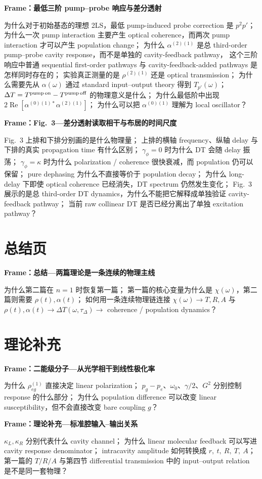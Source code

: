 \documentclass[11pt]{ctexart}
\newcommand{\framecue}[1]{%
  \par\smallskip
  \noindent\textbf{#1}\quad
}
\begin{document}
\framecue{Frame：最低三阶 pump--probe 响应与差分透射}
为什么对于初始基态的理想 2LS，最低 pump-induced probe correction 是 \(p^2p'\)；
为什么一次 pump interaction 主要产生 optical coherence，而两次 pump interaction 才可以产生 population change；
为什么 \(\alpha^{(2)(1)}\) 是总 third-order pump--probe cavity response，而不是单独的 cavity-feedback pathway，
这个三阶响应中普通 sequential first-order pathways 与 cavity-feedback-added pathways 是怎样同时存在的；
实验真正测量的是 \(\rho^{(2)(1)}\) 还是 optical transmission；
为什么需要先从 \(\alpha(\omega)\) 通过 standard input--output theory 得到 \(T_{p'}(\omega)\)；
\(\Delta T=T^{\rm pump\,on}-T^{\rm pump\,off}\) 的物理意义是什么；
为什么最低阶中出现 \(2\operatorname{Re}\left[\alpha^{(0)(1)*}\alpha^{(2)(1)}\right]\)；
为什么可以把 \(\alpha^{(0)(1)}\) 理解为 local oscillator？

\framecue{Frame：Fig.~3---差分透射读取相干与布居的时间尺度}
Fig.~3 上排和下排分别画的是什么物理量；
上排的横轴 frequency、纵轴 delay 与下排的真实 propagation time 有什么区别；
\(\gamma_\phi=0\) 时为什么 DT 会随 delay 振荡；
\(\gamma_\phi=\kappa\) 时为什么 polarization / coherence 很快衰减，而 population 仍可以保留；
pure dephasing 为什么不直接等价于 population decay；
为什么 long-delay 下即使 optical coherence 已经消失，DT spectrum 仍然发生变化；
Fig.~3 展示的是总 third-order DT dynamics，为什么不能把它解释成单独验证 cavity-feedback pathway；
当前 raw collinear DT 是否已经分离出了单独 excitation pathway？

\section*{总结页}

\framecue{Frame：总结---两篇理论是一条连续的物理主线}
为什么第二篇在 \(n=1\) 时恢复第一篇；
第一篇的核心变量为什么是 \(\chi(\omega)\)，第二篇则需要 \(\rho(t),\alpha(t)\)；
如何用一条连续物理链连接 \(\chi(\omega)\rightarrow T,R,A\) 与
\(\rho(t),\alpha(t)\rightarrow\Delta T(\omega,\tau_\Delta)\rightarrow\) coherence / population dynamics？

\section*{理论补充}

\framecue{Frame：二能级分子---从光学相干到线性极化率}
为什么 \(\rho_{eg}^{(1)}\) 直接决定 linear polarization；
\(p_g-p_e\)、\(\omega_0\)、\(\gamma/2\)、\(G^2\) 分别控制 response 的什么部分；
为什么 population difference 可以改变 linear susceptibility，但不会直接改变 bare coupling \(g\)？

\framecue{Frame：理论补充---标准腔输入--输出关系}
\(\kappa_L,\kappa_R\) 分别代表什么 cavity channel；
为什么 linear molecular feedback 可以写进 cavity response denominator；
intracavity amplitude 如何转换成 \(r,\ t,\ R,\ T,\ A\)；
第一篇的 \(T/R/A\) 与第四节 differential transmission 中的 input--output relation 是不是同一套物理？
\end{document}
